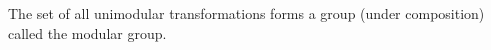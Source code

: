 The set of all unimodular transformations forms a group (under composition) called the modular group.
